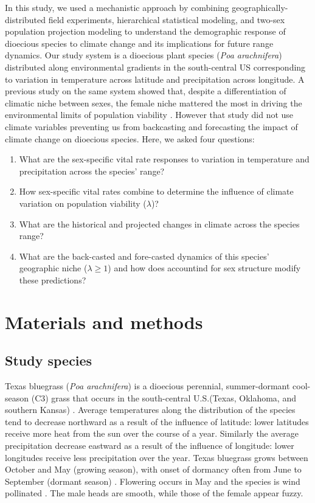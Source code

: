 \documentclass[12pt]{article}
\begin{document}
In this study, we used a mechanistic approach by combining geographically-distributed field experiments, hierarchical statistical modeling, and two-sex population projection modeling to understand the demographic response of dioecious species to climate change and its implications for future range dynamics.
Our study system is a dioecious plant species (\textit{Poa arachnifera}) distributed along environmental gradients in the south-central US corresponding to variation in temperature across latitude and precipitation across longitude. 
A previous study on the same system showed that, despite a differentiation of climatic niche between sexes, the female niche mattered the most in driving the environmental limits of population viability \citep{miller2022two}.
However that study did not use climate variables preventing us from backcasting and forecasting the impact of climate change on dioecious species.
Here, we asked four questions: 
\begin{enumerate}
	\item What are the sex-specific vital rate responses to variation in temperature and precipitation across the species' range?
	\item How sex-specific vital rates combine to determine the influence of climate variation on population viability ($\lambda$)?
	\item What are the historical and projected changes in climate across the species range?
	\item What are the back-casted and fore-casted dynamics of this species' geographic niche ($\lambda \geq 1$) and how does accountind for sex structure modify these predictions?
\end{enumerate}

\section*{Materials and methods}

\subsection*{Study species}
Texas bluegrass (\textit{Poa arachnifera}) is a dioecious perennial, summer-dormant cool-season (C3) grass that occurs in the south-central U.S.(Texas, Oklahoma, and southern Kansas) \citep{hitchcock1971manual}. 
Average temperatures along the distribution of the species tend to decrease northward as a result of the influence of latitude: lower latitudes receive more heat from the sun over the course of a year.
Similarly the average precipitation decrease eastward as a result of the influence of longitude: lower longitudes receive less precipitation over the year.
Texas bluegrass grows between October and May (growing season), with onset of dormancy often from June to September (dormant season) \citep{kindiger2004interspecific}.
Flowering occurs in May and the species is wind pollinated \citep{hitchcock1971manual}.
{\color{blue} The male heads are smooth, while those of the female appear fuzzy.}
\end{document}
